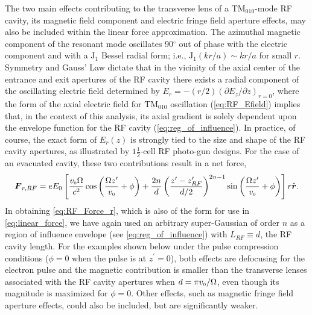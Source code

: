 The two main effects contributing to the transverse lens of a $\text{TM}_{010}$-mode RF cavity, its magnetic field component and electric fringe field aperture effects, may also be included within the linear force approximation.
The azimuthal magnetic component of the resonant mode oscillates 90$^{\circ}$ out of phase with the electric component and with a $\operatorname{ J_{1} }$ Bessel radial form; i.e., $ \operatorname{ J_{1} }( k r / a ) \sim k r / a $ for small $r$.
Symmetry and Gauss' Law dictate that in the vicinity of the axial center of the entrance and exit apertures of the RF cavity there exists a radial component of the oscillating electric field determined by $ E_{r} = -\left ( r / 2 \right ) \left ( \partial E_{z} / \partial z \right )_{r=0} $,\cite{kim_rf_1989} where the form of the axial electric field for $\text{TM}_{010}$ oscillation (\ref{eq:RF_Efield}) implies that, in the context of this analysis, its axial gradient is solely dependent upon the envelope function for the RF cavity (\ref{eq:reg_of_influence}).
In practice, of course, the exact form of $E_{r}(z)$ is strongly tied to the size and shape of the RF cavity apertures, as illustrated by $1 \frac{1}{2}$-cell RF photo-gun designs.\cite{mcdonald_design_1988}
For the case of an evacuated cavity, these two contributions result in a net force,
\begin{equation} \label{eq:RF_Force_r}
  \boldsymbol{F}_{ r , RF } = e E_{0} \left [ 
    \frac{ v_{{\scriptscriptstyle 0}} \Omega }{c^{2}} \cos \left ( \frac{ \Omega z^{\prime} }{ v_{{\scriptscriptstyle 0}} } + \phi \right ) + \frac{2 n}{d} \left ( \frac{z^{\prime} - z^{\prime}_{RF}}{d / 2} \right )^{2 n - 1} \sin \left ( \frac{ \Omega z^{\prime} }{ v_{{\scriptscriptstyle 0}} } + \phi \right )
   \right ] r \hat{\operatorname{ \boldsymbol{r} }} \text{.}
\end{equation}
In obtaining \ref{eq:RF_Force_r}, which is also of the form for use in \ref{eq:linear_force}, we have again used an arbitrary super-Gaussian of order $n$ as a region of influence envelope (see \ref{eq:reg_of_influence}) with $L_{RF} \equiv d$, the RF cavity length.
For the examples shown below under the pulse compression conditions ($\phi = 0$ when the pulse is at $z^{\prime} = 0$), both effects are defocusing for the electron pulse and the magnetic contribution is smaller than the transverse lenses associated with the RF cavity apertures when $ d = \pi v_{{\scriptscriptstyle 0}} / \Omega $,\cite{kim_rf_1989} even though its magnitude is maximized for $\phi = 0$.
Other effects, such as magnetic fringe field aperture effects, could also be included, but are significantly weaker.

